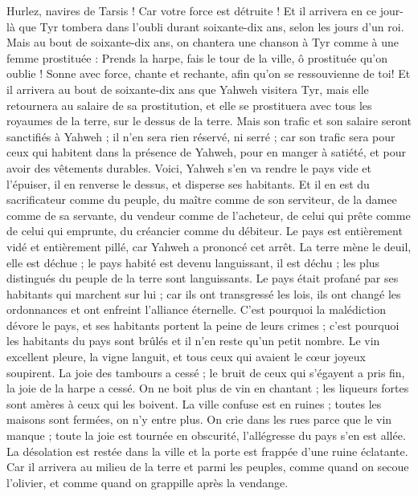 \begin{multicols}{2}
Hurlez, navires de Tarsis ! Car votre force est détruite !
Et il arrivera en ce jour-là que Tyr tombera dans l'oubli durant soixante-dix ans, selon les jours d'un roi. Mais au bout de soixante-dix ans, on chantera une chanson à Tyr comme à une femme prostituée :
Prends la harpe, fais le tour de la ville, ô prostituée qu'on oublie ! Sonne avec force, chante et rechante, afin qu'on se ressouvienne de toi!
Et il arrivera au bout de soixante-dix ans que Yahweh visitera Tyr, mais elle retournera au salaire de sa prostitution, et elle se prostituera avec tous les royaumes de la terre, sur le dessus de la terre.
Mais son trafic et son salaire seront sanctifiés à Yahweh ; il n'en sera rien réservé, ni serré ; car son trafic sera pour ceux qui habitent dans la présence de Yahweh, pour en manger à satiété, et pour avoir des vêtements durables.
\VerseOne{}Voici, Yahweh s'en va rendre le pays vide et l'épuiser, il en renverse le dessus, et disperse ses habitants.
Et il en est du sacrificateur comme du peuple, du maître comme de son serviteur, de la damee comme de sa servante, du vendeur comme de l'acheteur, de celui qui prête comme de celui qui emprunte, du créancier comme du débiteur.
Le pays est entièrement vidé et entièrement pillé, car Yahweh a prononcé cet arrêt.
La terre mène le deuil, elle est déchue ; le pays habité est devenu languissant, il est déchu ; les plus distingués du peuple de la terre sont languissants.
Le pays était profané par ses habitants qui marchent sur lui ; car ils ont transgressé les lois, ils ont changé les ordonnances et ont enfreint l'alliance éternelle.
C'est pourquoi la malédiction dévore le pays, et ses habitants portent la peine de leurs crimes ; c'est pourquoi les habitants du pays sont brûlés et il n'en reste qu'un petit nombre.
Le vin excellent pleure, la vigne languit, et tous ceux qui avaient le cœur joyeux soupirent.
La joie des tambours a cessé ; le bruit de ceux qui s'égayent a pris fin, la joie de la harpe a cessé.
On ne boit plus de vin en chantant ; les liqueurs fortes sont amères à ceux qui les boivent.
La ville confuse est en ruines ; toutes les maisons sont fermées, on n'y entre plus.
On crie dans les rues parce que le vin manque ; toute la joie est tournée en obscurité, l'allégresse du pays s'en est allée.
La désolation est restée dans la ville et la porte est frappée d'une ruine éclatante.
Car il arrivera au milieu de la terre et parmi les peuples, comme quand on secoue l'olivier, et comme quand on grappille après la vendange.

\end{multicols}
